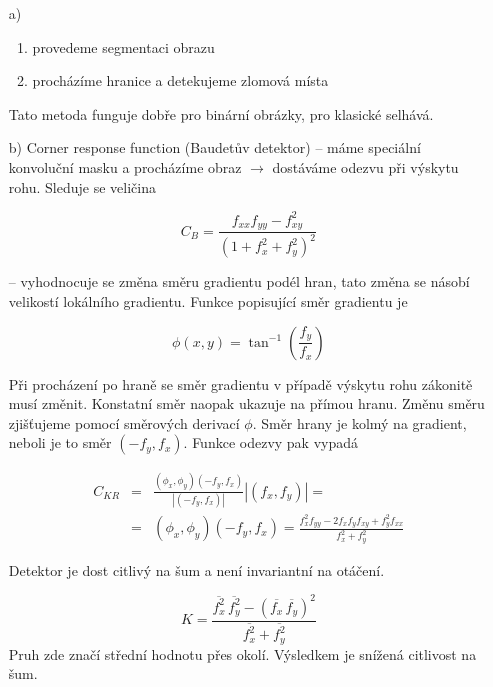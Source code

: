 \begin{itemize}
\item[a)]
\begin{enumerate}
\item provedeme segmentaci obrazu
\item procházíme hranice a detekujeme zlomová místa
\end{enumerate}
Tato metoda funguje dobře pro binární obrázky, pro klasické selhává.
\item[b)] Corner response function (Baudetův detektor) -- 
máme speciální konvoluční masku a procházíme obraz $\rightarrow$ 
dostáváme odezvu při výskytu rohu. Sleduje se veličina 

\begin{equation}
C_B=\frac{f_{xx}f_{yy}-f_{xy}^2}{(1+f_x^2+f_y^2)^2}
\end{equation}

 -- vyhodnocuje se změna směru gradientu podél hran, tato změna se násobí 
velikostí lokálního gradientu. Funkce popisující směr gradientu je

\begin{equation}
\phi(x,y)=\tan^{-1}\left(\frac{f_y}{f_x}\right)
\end{equation}

Při procházení po hraně se směr gradientu v případě výskytu rohu zákonitě musí změnit. Konstatní směr naopak
ukazuje na přímou hranu. Změnu směru zjišťujeme pomocí směrových derivací $\phi$. Směr hrany je kolmý na gradient,
neboli je to směr $(-f_y,f_x)$. Funkce odezvy pak vypadá

\begin{eqnarray}
C_{KR}&=&\frac{(\phi_x,\phi_y)(-f_y,f_x)}{\left|(-f_y,f_x)\right|}\left|(f_x,f_y)\right|=\nonumber\\
&=&(\phi_x,\phi_y)(-f_y,f_x)=\frac{f^2_xf_{yy}-2f_xf_yf_{xy}+f_y^2f_{xx}}{f_x^2+f_y^2}
\end{eqnarray}

Detektor je dost citlivý na šum a není invariantní na otáčení.


\begin{equation}
K=\frac{\overline{f^2_x}\,\overline{f^2_y}-(\overline{f_x}\,\overline{f_y})^2}{\overline{f^2_x}+\overline{f^2_y}}
\end{equation}
Pruh zde značí střední hodnotu přes okolí. Výsledkem je snížená citlivost na šum.

\end{itemize}


